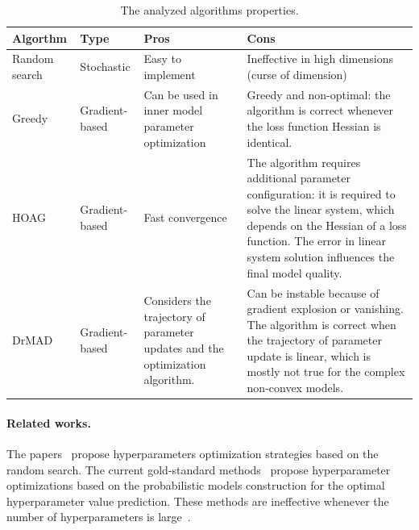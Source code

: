 \documentclass[smallcondensed]{svjour3}
\begin{document}
\begin{table}
\footnotesize

\begin{tabularx}{\textwidth}{|p{2cm}|p{2cm}|X|X|}
\hline
\bf Algorthm & \bf Type  & \bf Pros & \bf Cons  \\ \hline
Random search & Stochastic & Easy to implement & Ineffective in high dimensions (curse of dimension)\\ \hline
Greedy~\cite{hyper_greed} & Gradient-based & Can be used in inner model parameter optimization& Greedy and non-optimal: the algorithm is correct whenever the loss function Hessian is identical. \\ \hline
HOAG~\cite{hyper_hoag} & Gradient-based & Fast convergence & The algorithm requires additional parameter configuration: it is required to solve the linear system, which depends on the Hessian of a loss function. The error in linear system solution influences the final model quality.\\ \hline 
DrMAD~\cite{hyper_mad} & Gradient-based & Considers the trajectory of parameter updates and the optimization algorithm.& Can be instable because of gradient explosion or vanishing. The algorithm is correct when the trajectory of parameter update is linear, which is mostly not true for the complex non-convex models. \\ \hline
\end{tabularx}

\caption{The analyzed algorithms properties.}
\label{table:algo_descr}

\end{table}


\paragraph{Related works.}
The papers~\cite{random1,random2} propose hyperparameters optimization strategies based on the random search. The current gold-standard methods~\cite{probopt1,probopt2}   propose hyperparameter optimizations based on the probabilistic models construction for the optimal hyperparameter value prediction. These methods are  ineffective whenever the number of hyperparameters is large~\cite{hyper}.
\end{document}
